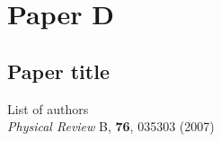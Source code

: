 \chapter*{Paper D}
\section{Paper title}

\noindent List of authors\\

\noindent \textit{Physical Review} B, \textbf{76}, 035303 (2007)
\cleardoublepage

